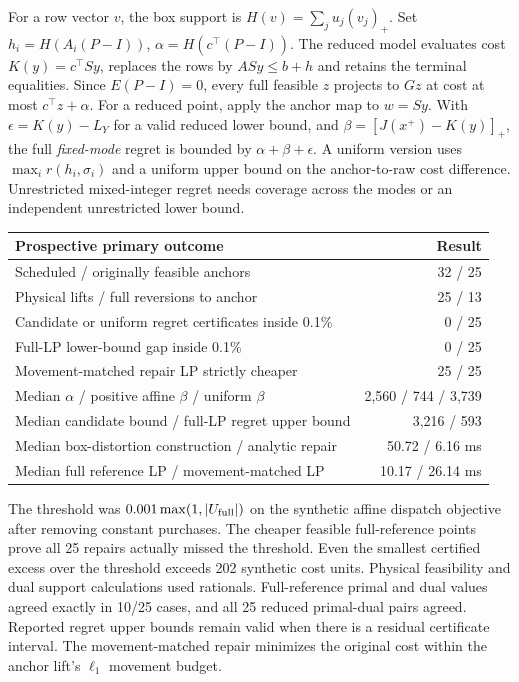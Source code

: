 \documentclass[10pt,letterpaper]{article}
\begin{document}
For a row vector $v$, the box support is $H(v)=\sum_j u_j(v_j)_+$. Set $h_i=H(A_i(P-I))$, $\alpha=H(c^\top(P-I))$. The reduced model evaluates cost $K(y)=c^\top Sy$, replaces the rows by $ASy\le b+h$ and retains the terminal equalities. Since $E(P-I)=0$, every full feasible $z$ projects to $Gz$ at cost at most $c^\top z+\alpha$. For a reduced point, apply the anchor map to $w=Sy$. With $\epsilon=K(y)-L_Y$ for a valid reduced lower bound, and $\beta=[J(x^+)-K(y)]_+$, the full \emph{fixed-mode} regret is bounded by $\alpha+\beta+\epsilon$. A uniform version uses $\max_i r(h_i,\sigma_i)$ and a uniform upper bound on the anchor-to-raw cost difference. Unrestricted mixed-integer regret needs coverage across the modes or an independent unrestricted lower bound.

\begin{center}\small
\begin{tabular}{@{}lr@{}}
\toprule
Prospective primary outcome & Result\\\midrule
Scheduled / originally feasible anchors & 32 / 25\\
Physical lifts / full reversions to anchor & 25 / 13\\
Candidate or uniform regret certificates inside 0.1\% & 0 / 25\\
Full-LP lower-bound gap inside 0.1\% & 0 / 25\\
Movement-matched repair LP strictly cheaper & 25 / 25\\
Median $\alpha$ / positive affine $\beta$ / uniform $\beta$ & 2,560 / 744 / 3,739\\
Median candidate bound / full-LP regret upper bound & 3,216 / 593\\
Median box-distortion construction / analytic repair & 50.72 / 6.16 ms\\
Median full reference LP / movement-matched LP & 10.17 / 26.14 ms\\\bottomrule
\end{tabular}
\end{center}
The threshold was $0.001\max(1,|U_{\rm full}|)$ on the synthetic affine dispatch objective after removing constant purchases. The cheaper feasible full-reference points prove all 25 repairs actually missed the threshold. Even the smallest certified excess over the threshold exceeds 202 synthetic cost units. Physical feasibility and dual support calculations used rationals. Full-reference primal and dual values agreed exactly in 10/25 cases, and all 25 reduced primal-dual pairs agreed. Reported regret upper bounds remain valid when there is a residual certificate interval. The movement-matched repair minimizes the original cost within the anchor lift's $\ell_1$ movement budget.
\end{document}
